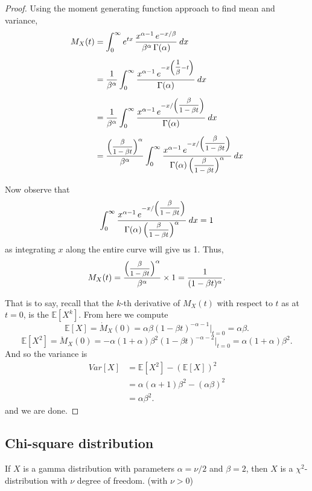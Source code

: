 \begin{proof}
    Using the moment generating function approach to find mean and variance,
    \begin{align*}
        M_X(t) &= \int_{0}^{\infty} e^{tx}\, \frac{x^{\alpha - 1}\, e^{-x/\beta}}{\beta^\alpha\, \Gamma(\alpha)}\> dx \\[0.5em]
        &= \frac{1}{\beta^\alpha} \int_{0}^{\infty} \frac{x^{\alpha - 1}\, e^{-x \left( \mfrac{1}{\beta}-t \right)} }{\Gamma(\alpha)} \> dx \\[0.5em]
        &= \frac{1}{\beta^\alpha} \int_{0}^{\infty} \frac{x^{\alpha - 1}\, e^{-x / \left( \mfrac{\beta}{1 - \beta t } \right)} }{\Gamma(\alpha)} \> dx \\[0.5em]
        &= \frac{\left( \mfrac{\beta}{1 - \beta t } \right)^\alpha}{\beta^\alpha} \int_{0}^{\infty} \frac{x^{\alpha - 1}\, e^{-x/ \left( \mfrac{\beta}{1 - \beta t } \right)} }{\Gamma(\alpha) \left( \mfrac{\beta}{1 - \beta t } \right)^\alpha } \> dx \\[0.5em]
    \end{align*}
    Now observe that 
    \[
        \int_{0}^{\infty} \frac{x^{\alpha - 1}\, e^{-x/ \left( \mfrac{\beta}{1 - \beta t } \right)} }{\Gamma(\alpha) \left( \mfrac{\beta}{1 - \beta t } \right)^\alpha } \> dx = 1
    \]
    as integrating $x$ along the entire curve will give us 1. Thus, 
    \begin{equation}
        M_X(t) = \frac{\left( \mfrac{\beta}{1 - \beta t } \right)^\alpha}{\beta^\alpha} \times 1  = \frac{1}{(1 - \beta t )^\alpha}.
    \end{equation}

    That is to say, recall that the $k$-th derivative of $M_X(t)$ with respect to $t$ as at $t = 0$, is the 
    $\mathbb{E}[X^k]$. From here we compute
    \[
        \mathbb{E}[X] = \dot{M}_X(0) = \alpha \beta (1 - \beta t)^{-\alpha - 1} \big \vert_{t = 0} = \alpha \beta.
    \]
    \[
        \mathbb{E}[X^2] = \ddot{M}_X(0) = -\alpha (1 + \alpha) \beta^2 (1 - \beta t)^{-\alpha - 2} \big \vert_{t = 0} = \alpha (1 + \alpha) \beta^2.
    \]
    And so the variance is 
    \begin{align*}
        Var[X] &= \mathbb{E}[X^2] - (\mathbb{E}[X])^2 \\
        &= \alpha (\alpha + 1) \beta^2 - (\alpha \beta)^2\\
        &= \alpha \beta^2.
    \end{align*}
    and we are done.
\end{proof}

\subsection{Chi-square distribution}

\begin{definition}
    If $X$ is a gamma distribution with parameters $\alpha = \nu / 2$ and $\beta = 2$, then $X$ is 
    a $\chi^2$-distribution with $\nu$ degree of freedom. (with $\nu > 0$)
\end{definition}